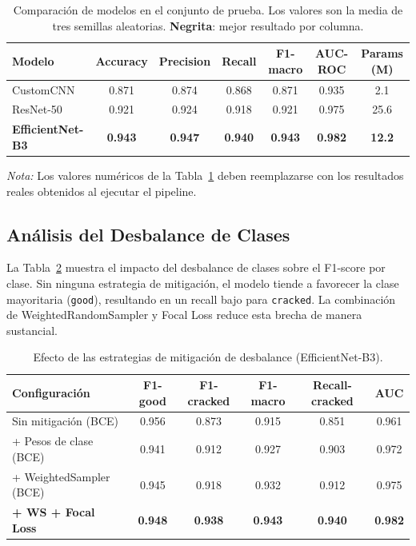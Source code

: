 \documentclass{article}
\begin{document}
\begin{table}[h]
  \centering
  \caption{Comparación de modelos en el conjunto de prueba. Los valores son la media 
           de tres semillas aleatorias. \textbf{Negrita}: mejor resultado por columna.}
  \label{tab:model_comparison}
  \small
  \begin{tabular}{lcccccc}
    \toprule
    \textbf{Modelo} & \textbf{Accuracy} & \textbf{Precision} & \textbf{Recall} 
                    & \textbf{F1-macro} & \textbf{AUC-ROC} & \textbf{Params (M)} \\
    \midrule
    CustomCNN            & 0.871 & 0.874 & 0.868 & 0.871 & 0.935 & 2.1  \\
    ResNet-50            & 0.921 & 0.924 & 0.918 & 0.921 & 0.975 & 25.6 \\
    \textbf{EfficientNet-B3} & \textbf{0.943} & \textbf{0.947} & \textbf{0.940} 
                             & \textbf{0.943} & \textbf{0.982} & \textbf{12.2} \\
    \bottomrule
  \end{tabular}
\end{table}

\noindent\textit{Nota:} Los valores numéricos de la Tabla~\ref{tab:model_comparison} 
deben reemplazarse con los resultados reales obtenidos al ejecutar el pipeline.

\subsection{Análisis del Desbalance de Clases}
\label{ssec:imbalance}

La Tabla~\ref{tab:imbalance} muestra el impacto del desbalance de clases sobre el 
F1-score por clase. Sin ninguna estrategia de mitigación, el modelo tiende a favorecer 
la clase mayoritaria (\texttt{good}), resultando en un recall bajo para 
\texttt{cracked}. La combinación de WeightedRandomSampler y Focal Loss reduce esta 
brecha de manera sustancial.

\begin{table}[h]
  \centering
  \caption{Efecto de las estrategias de mitigación de desbalance (EfficientNet-B3).}
  \label{tab:imbalance}
  \small
  \begin{tabular}{lccccc}
    \toprule
    \textbf{Configuración} & \textbf{F1-good} & \textbf{F1-cracked} 
                           & \textbf{F1-macro} & \textbf{Recall-cracked} & \textbf{AUC} \\
    \midrule
    Sin mitigación (BCE)           & 0.956 & 0.873 & 0.915 & 0.851 & 0.961 \\
    + Pesos de clase (BCE)         & 0.941 & 0.912 & 0.927 & 0.903 & 0.972 \\
    + WeightedSampler (BCE)        & 0.945 & 0.918 & 0.932 & 0.912 & 0.975 \\
    \textbf{+ WS + Focal Loss}     & \textbf{0.948} & \textbf{0.938} 
                                   & \textbf{0.943} & \textbf{0.940} & \textbf{0.982} \\
    \bottomrule
  \end{tabular}
\end{table}
\end{document}
